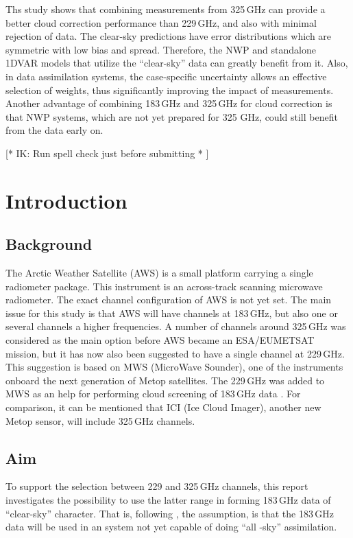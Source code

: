 \documentclass[12pt]{article}
\begin{document}
Ths study shows that combining measurements from 325\,GHz can provide a better cloud correction performance than 229\,GHz, and also with minimal rejection of data. The clear-sky predictions have error distributions which are symmetric with low bias and spread. Therefore, the NWP and standalone 1DVAR models that utilize the ``clear-sky'' data can greatly benefit from it. Also, in data assimilation systems, the case-specific uncertainty allows an effective selection of weights, thus significantly improving the impact of measurements. Another advantage of combining 183\,GHz and 325\,GHz for cloud correction is that NWP systems, which are not yet prepared for 325 GHz, could still benefit from the data early on.


[* IK: Run spell check just before submitting * ]


\setcounter{tocdepth}{1} 
\tableofcontents


\newpage
\setcounter{page}{1}

\section{Introduction}
%
\subsection{Background}
The Arctic Weather Satellite (AWS) is a small platform carrying a single
radiometer package. This instrument is an across-track scanning microwave
radiometer. The exact channel configuration of AWS is not yet set. The main
issue for this study is that AWS will have channels at 183\,GHz, but also one
or several channels a higher frequencies. A number of channels around 325\,GHz
was considered as the main option before AWS became an ESA/EUMETSAT mission,
but it has now also been suggested to have a single channel at 229\,GHz. This
suggestion is based on MWS (MicroWave Sounder), one of the instruments onboard
the next generation of Metop satellites. The 229\,GHz was added to MWS as an
help for performing cloud screening of 183\,GHz data
\citep{rekha2012potential}. For comparison, it can be mentioned that ICI (Ice
Cloud Imager), another new Metop sensor, will include 325\,GHz channels.

\subsection{Aim}
%
To support the selection between 229 and 325\,GHz channels, this report
investigates the possibility to use the latter range in forming 183\,GHz data of
``clear-sky'' character. That is, following \citet{rekha2012potential}, the
assumption, is that the 183\,GHz data will be used in an system not yet
capable of doing ``all -sky'' assimilation.
\end{document}
